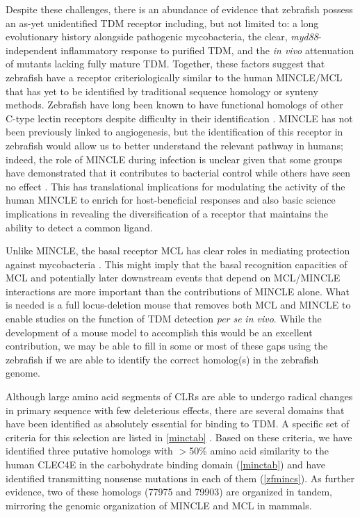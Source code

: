 Despite these challenges, there is an abundance of evidence that zebrafish possess an as\hyp{}yet unidentified TDM receptor including, but not limited to: a long evolutionary history alongside pathogenic mycobacteria, the clear, \textit{myd88}\hyp{}independent inflammatory response to purified TDM, and the \textit{in vivo} attenuation of mutants lacking fully mature TDM. Together, these factors suggest that zebrafish have a receptor criteriologically similar to the human MINCLE/MCL that has yet to be identified by traditional sequence homology or synteny methods. Zebrafish have long been known to have functional homologs of other C\hyp{}type lectin receptors despite difficulty in their identification \citep{Petit2019}. MINCLE has not been previously linked to angiogenesis, but the identification of this receptor in zebrafish would allow us to better understand the relevant pathway in humans; indeed, the role of MINCLE during infection is unclear given that some groups have demonstrated that it contributes to bacterial control \citep{Behler2012, Behler2015, Lee2012} while others have seen no effect \citep{Heitmann2013}. This has translational implications for modulating the activity of the human MINCLE to enrich for host\hyp{}beneficial responses and also basic science implications in revealing the diversification of a receptor that maintains the ability to detect a common ligand. 

Unlike MINCLE, the basal receptor MCL has clear roles in mediating protection against mycobacteria \citep{Wilson2015}. This might imply that the basal recognition capacities of MCL and potentially later downstream events that depend on MCL/MINCLE interactions are more important than the contributions of MINCLE alone. What is needed is a full locus\hyp{}deletion mouse that removes both MCL and MINCLE to enable studies on the function of TDM detection \textit{per se} \textit{in vivo}. While the development of a mouse model to accomplish this would be an excellent contribution, we may be able to fill in some or most of these gaps using the zebrafish if we are able to identify the correct homolog(s) in the zebrafish genome.

Although large amino acid segments of CLRs are able to undergo radical changes in primary sequence with few deleterious effects, there are several domains that have been identified as absolutely essential for binding to TDM. A specific set of criteria for this selection are listed in \autoref{minctab} \citep{Alenton2017, Feinberg2016, Feinberg2013, Bird2018, Furukawa2013, Zelensky2005}. Based on these criteria, we have identified three putative homologs with $>$50\% amino acid similarity to the human CLEC4E in the carbohydrate binding domain (\autoref{minctab}) and have identified transmitting nonsense mutations in each of them (\autoref{zfmincs}). As further evidence, two of these homologs (77975 and 79903) are organized in tandem, mirroring the genomic organization of MINCLE and MCL in mammals. 

